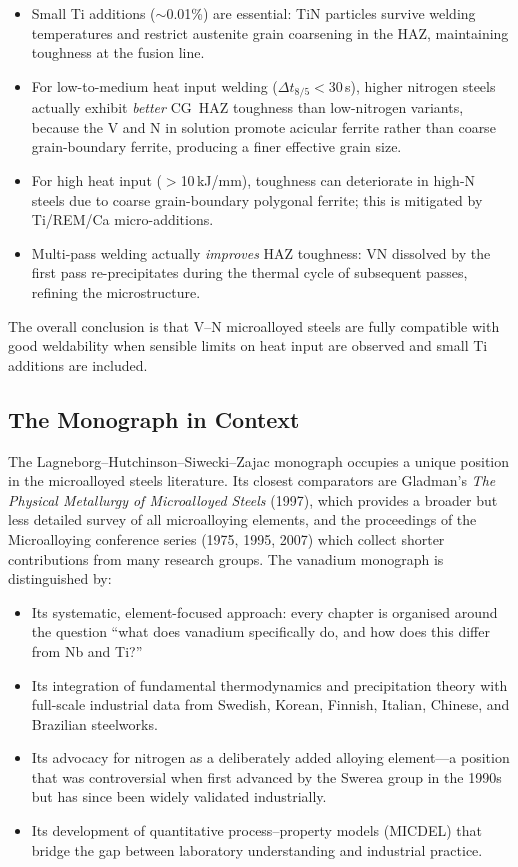 \documentclass[11pt,a4paper]{article}
\begin{document}
\begin{itemize}
  \item Small Ti additions ($\sim$0.01\%) are essential: TiN particles
    survive welding temperatures and restrict austenite grain coarsening
    in the HAZ, maintaining toughness at the fusion line.
  \item For low-to-medium heat input welding ($\Delta t_{8/5} < 30$\,s),
    higher nitrogen steels actually exhibit \emph{better} CG~HAZ
    toughness than low-nitrogen variants, because the V and N in
    solution promote acicular ferrite rather than coarse grain-boundary
    ferrite, producing a finer effective grain size.
  \item For high heat input ($>$10\,kJ/mm), toughness can deteriorate in
    high-N steels due to coarse grain-boundary polygonal ferrite; this
    is mitigated by Ti/REM/Ca micro-additions.
  \item Multi-pass welding actually \emph{improves} HAZ toughness: VN
    dissolved by the first pass re-precipitates during the thermal cycle
    of subsequent passes, refining the microstructure.
\end{itemize}

The overall conclusion is that V--N microalloyed steels are fully
compatible with good weldability when sensible limits on heat input are
observed and small Ti additions are included.

\subsection{The Monograph in Context}

The Lagneborg--Hutchinson--Siwecki--Zajac monograph occupies a unique
position in the microalloyed steels literature.  Its closest comparators
are Gladman's \emph{The Physical Metallurgy of Microalloyed Steels}
(1997), which provides a broader but less detailed survey of all
microalloying elements, and the proceedings of the Microalloying
conference series (1975, 1995, 2007) which collect shorter contributions
from many research groups.  The vanadium monograph is distinguished by:
\begin{itemize}
  \item Its systematic, element-focused approach: every chapter is
    organised around the question ``what does vanadium specifically do,
    and how does this differ from Nb and Ti?''
  \item Its integration of fundamental thermodynamics and precipitation
    theory with full-scale industrial data from Swedish, Korean, Finnish,
    Italian, Chinese, and Brazilian steelworks.
  \item Its advocacy for nitrogen as a deliberately added alloying
    element---a position that was controversial when first advanced by the
    Swerea group in the 1990s but has since been widely validated
    industrially.
  \item Its development of quantitative process--property models (MICDEL)
    that bridge the gap between laboratory understanding and industrial
    practice.
\end{itemize}
\end{document}
